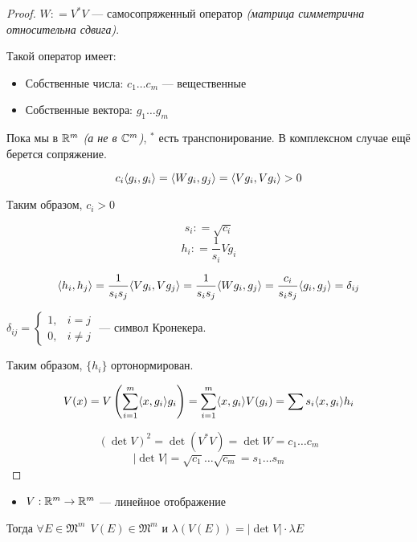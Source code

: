 \begin{proof}
    \(W : = V^* V\) --- самосопряженный оператор \textit{(матрица симметрична относительна сдвига)}.

    Такой оператор имеет:
    \begin{itemize}
        \item Собственные числа: \(c_1 \dots c_m\) --- вещественные
        \item Собственные вектора: \(g_1 \dots g_m\)
    \end{itemize}

    \begin{remark}
        Пока мы в \(\mathbb{R}^m\) \textit{(а не в \(\mathbb{C}^m\))}, \({}^*\) есть транспонирование. В комплексном случае ещё берется сопряжение.
    \end{remark}

    \[c_i \langle g_i, g_i\rangle = \langle W g_i, g_j\rangle = \langle V g_i, V g_i\rangle > 0\]

    Таким образом, \(c_i > 0\)

    \[s_i : = \sqrt{c_i}\]
    \[h_i : = \frac{1}{s_i} V g_i\]

    \[\langle h_i, h_j\rangle = \frac{1}{s_i s_j}\langle V g_i, V g_j\rangle = \frac{1}{s_i s_j}\langle W g_i, g_j\rangle = \frac{c_i}{s_i s_j}\langle g_i, g_j\rangle = \delta_{ij}\]

    \begin{remark}
        \(\delta_{ij} = \begin{cases}
            1, & i = j    \\
            0, & i \neq j
        \end{cases}\) --- символ Кронекера.
    \end{remark}

    Таким образом, \(\{h_i\}\) ортонормирован.

    \[V(x) = V\left( \sum_{i = 1}^m \langle x, g_i\rangle g_i \right) = \sum_{i = 1}^m \langle x, g_i\rangle V(g_i) = \sum s_i \langle x, g_i\rangle h_i\]

    \[(\det V)^2 = \det(V^* V) = \det W = c_1 \dots c_m\]
    \[|\det V| = \sqrt{c_1} \dots \sqrt{c_m} = s_1 \dots s_m\]
\end{proof}

\begin{theorem}\itemfix
    \begin{itemize}
        \item \(V : \mathbb{R}^m \to \mathbb{R}^m\) --- линейное отображение
    \end{itemize}
    Тогда \(\forall E \in \mathfrak{M}^m \ \ V(E) \in \mathfrak{M}^m\) и \(\lambda(V(E)) = |\det V| \cdot \lambda E\)
\end{theorem}

